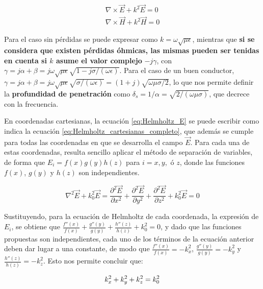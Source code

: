 \begin{subequations}
	\label{eq:Helmholtz}
	\begin{align}
		\nabla \times \vec{E} + k^2 \vec{E} = 0 \label{eq:Helmholtz_E} \\
		\nabla \times \vec{H} + k^2 \vec{H} = 0 \label{eq:Helmholtz_H}
	\end{align}
\end{subequations}

Para el caso sin pérdidas se puede expresar como $k = \omega \sqrt{\mu \epsilon}$, mientras que \textbf{si se considera que existen pérdidas óhmicas, las mismas pueden ser tenidas en cuenta si $k$ asume el valor complejo} $-j\gamma$, con $\gamma = j\alpha + \beta = j \omega \sqrt{\mu \epsilon} \sqrt{1-j \sigma/(\omega \epsilon)}$. Para el caso de un buen conductor, $\gamma = j\alpha + \beta = j \omega \sqrt{\mu \epsilon} \sqrt{\sigma/(\omega \epsilon)} = (1+j) \sqrt{\omega \mu \sigma/2}$, lo que nos permite definir la \textbf{profundidad de penetración} como $\delta_s = 1/\alpha = \sqrt{2/(\omega \mu \sigma)}$, que decrece con la frecuencia.

En coordenadas cartesianas, la ecuación \ref{eq:Helmholtz_E} se puede escribir como indica la ecuación \ref{eq:Helmholtz_cartesianas_completo}, que además se cumple para todas las coordenadas en que se desarrolla el campo $\vec{E}$. Para cada una de estas coordenadas, resulta sencillo aplicar el método de separación de variables, de forma que $E_i = f(x)g(y)h(z)$ para $i=x, y,$ ó $z$, donde las funciones $f(x)$, $g(y)$ y $h(z)$ son independientes.

\begin{equation}
	\label{eq:Helmholtz_cartesianas_completo}
	\nabla^2 \vec{E} + k_0^2 \vec{E} = \frac{\partial^2 \vec{E}}{\partial x^2} + \frac{\partial^2 \vec{E}}{\partial y^2} + \frac{\partial^2 \vec{E}}{\partial z^2} +  k_0^2 \vec{E} = 0
\end{equation}

Sustituyendo, para la ecuación de Helmholtz de cada coordenada, la expresión de $E_i$, se obtiene que $\frac{f''(x)}{f(x)} + \frac{g''(y)}{g(y)} + \frac{h''(z)}{h(z)} + k_0^2 = 0$, y dado que las funciones propuestas son independientes, cada uno de los términos de la ecuación anterior deben dar lugar a una constante, de modo que $\frac{f''(x)}{f(x)} = -k_x^2$, $\frac{g''(y)}{g(y)} = -k_y^2$ y $\frac{h''(z)}{h(z)} = -k_z^2$. Esto nos permite concluir que:

\begin{equation}
	\label{eq:numero_de_onda}
	k_x^2 + k_y^2 + k_z^2 = k_0^2 \\
\end{equation}

